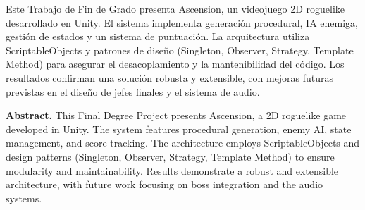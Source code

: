 Este Trabajo de Fin de Grado presenta Ascension, un videojuego 2D roguelike desarrollado en Unity. El sistema implementa generación procedural, IA enemiga, gestión de estados y un sistema de puntuación. La arquitectura utiliza ScriptableObjects y patrones de diseño (Singleton, Observer, Strategy, Template Method) para asegurar el desacoplamiento y la mantenibilidad del código. Los resultados confirman una solución robusta y extensible, con mejoras futuras previstas en el diseño de jefes finales y el sistema de audio.

\vspace{1.5cm}

\textbf{Abstract.} This Final Degree Project presents Ascension, a 2D roguelike game developed in Unity. The system features procedural generation, enemy AI, state management, and score tracking. The architecture employs ScriptableObjects and design patterns (Singleton, Observer, Strategy, Template Method) to ensure modularity and maintainability. Results demonstrate a robust and extensible architecture, with future work focusing on boss integration and the audio systems.